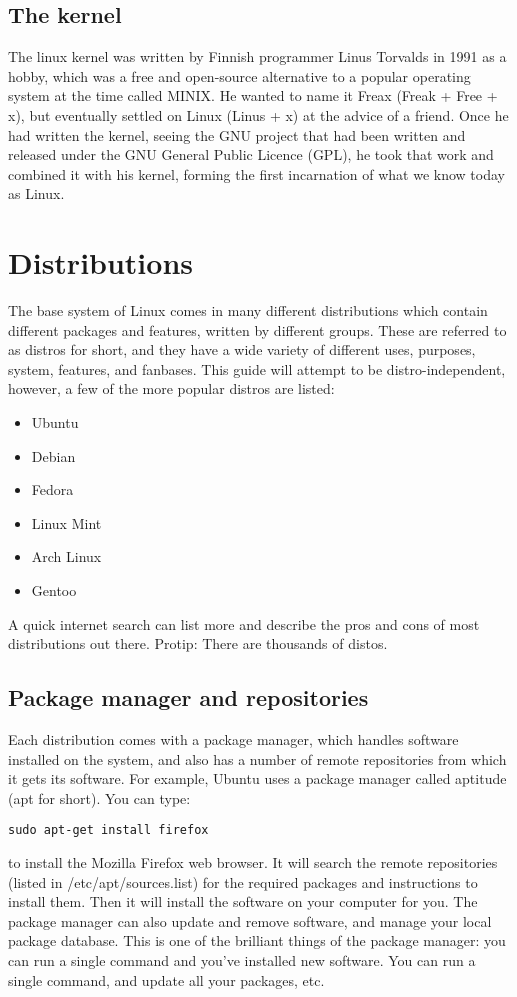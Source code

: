 \documentclass{article}
\begin{document}
\subsection{The kernel}
The linux kernel was written by Finnish programmer Linus Torvalds in 1991 as a hobby, which was a free and open-source alternative to a popular operating system at the time called MINIX. He wanted to name it Freax (Freak + Free + x), but eventually settled on Linux (Linus + x) at the advice of a friend. Once he had written the kernel, seeing the GNU project that had been written and released under the GNU General Public Licence (GPL), he took that work and combined it with his kernel, forming the first incarnation of what we know today as Linux.

\section{Distributions}
The base system of Linux comes in many different distributions which contain different packages and features, written by different groups. These are referred to as distros for short, and they have a wide variety of different uses, purposes, system, features, and fanbases.
This guide will attempt to be distro-independent, however, a few of the more popular distros are listed:
\begin{itemize}
\item Ubuntu
\item Debian
\item Fedora
\item Linux Mint
\item Arch Linux
\item Gentoo
\end{itemize}
A quick internet search can list more and describe the pros and cons of most distributions out there. Protip: There are thousands of distos.

\subsection{Package manager and repositories}
Each distribution comes with a package manager, which handles software installed on the system, and also has a number of remote repositories from which it gets its software. For example, Ubuntu uses a package manager called aptitude (apt for short). You can type:
\begin{verbatim}
sudo apt-get install firefox
\end{verbatim}
to install the Mozilla Firefox web browser. It will search the remote repositories (listed in /etc/apt/sources.list) for the required packages and instructions to install them. Then it will install the software on your computer for you. The package manager can also update and remove software, and manage your local package database. This is one of the brilliant things of the package manager: you can run a single command and you've installed new software. You can run a single command, and update all your packages, etc.
\end{document}
